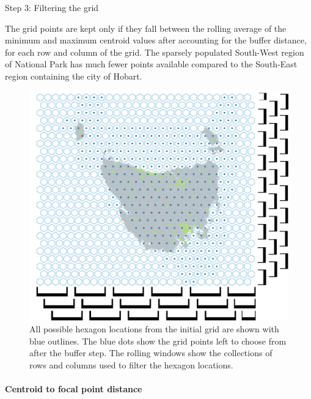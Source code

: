 \documentclass[
]{jss}
\begin{document}
Step 3: Filtering the grid

The grid points are kept only if they fall between the rolling average
of the minimum and maximum centroid values after accounting for the
buffer distance, for each row and column of the grid. The sparsely
populated South-West region of National Park has much fewer points
available compared to the South-East region containing the city of
Hobart.

\begin{CodeChunk}
\begin{figure}

{\centering \includegraphics[width=1\linewidth]{figures/3grid} 

}

\caption[All possible hexagon locations from the initial grid are shown with blue outlines]{All possible hexagon locations from the initial grid are shown with blue outlines. The blue dots show the grid points left to choose from after the buffer step. The rolling windows show the collections of rows and columns used to filter the hexagon locations.}\label{fig:filter_grid}
\end{figure}
\end{CodeChunk}

\hypertarget{centroid-to-focal-point-distance}{%
\paragraph{Centroid to focal point
distance}\label{centroid-to-focal-point-distance}}
\end{document}
